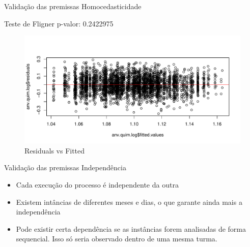 \documentclass[
  ignorenonframetext,
]{beamer}
\providecommand{\tightlist}{%
  \setlength{\itemsep}{0pt}\setlength{\parskip}{0pt}}
\begin{document}
\begin{frame}{Validação das premissas \textbar{} Homocedasticidade}
\protect\hypertarget{validacao-das-premissas-homocedasticidade}{}

Teste de Fligner p-valor: 0.2422975

\begin{figure}

{\centering \includegraphics{apresentacao_final_files/figure-beamer/assum_homoc-1} 

}

\caption{Residuals vs Fitted}\label{fig:assum_homoc}
\end{figure}

\end{frame}

\begin{frame}{Validação das premissas \textbar{} Independência}
\protect\hypertarget{validacao-das-premissas-independencia}{}

\begin{itemize}
\tightlist
\item
  Cada execução do processo é independente da outra
\item
  Existem intâncias de diferentes meses e dias, o que garante ainda mais
  a independência
\item
  Pode existir certa dependência se as instâncias forem analisadas de
  forma sequencial. Isso só seria observado dentro de uma mesma turma.
\end{itemize}

\end{frame}
\end{document}
